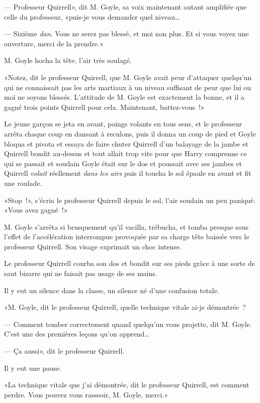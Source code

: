 --- Professeur Quirrell», dit M. Goyle, sa voix maintenant autant amplifiée que celle du professeur, «puis-je vous demander quel niveau…

--- Sixième \emph{dan}. Vous ne serez pas blessé, et moi non plus. Et si vous voyez une ouverture, merci de la prendre.»

M. Goyle hocha la tête, l'air très soulagé.

«Notez, dit le professeur Quirrell, que M. Goyle avait peur d'attaquer quelqu'un qui ne connaissait pas les arts martiaux à un niveau suffisant de peur que lui ou moi ne soyons blessés. L'attitude de M. Goyle est exactement la bonne, et il a gagné trois points Quirrell pour cela. Maintenant, battez-vous~!»

Le jeune garçon se jeta en avant, poings volants en tous sens, et le professeur arrêta chaque coup en dansant à reculons, puis il donna un coup de pied et Goyle bloqua et pivota et essaya de faire chuter Quirrell d'un balayage de la jambe et Quirrell bondit au-dessus et tout allait trop vite pour que Harry comprenne ce qui se passait et soudain Goyle était sur le dos et poussait avec ses jambes et Quirrell \emph{volait} réellement \emph{dans les airs} puis il toucha le sol épaule en avant et fit une roulade.

«Stop~!», s'écria le professeur Quirrell depuis le sol, l'air soudain un peu paniqué. «Vous avez gagné~!»

M. Goyle s'arrêta si brusquement qu'il vacilla, trébucha, et tomba presque sous l'effet de l'accélération interrompue provoquée par sa charge tête baissée vers le professeur Quirrell. Son visage exprimait un choc intense.

Le professeur Quirrell courba son dos et bondit sur ses pieds grâce à une sorte de saut bizarre qui ne faisait pas usage de ses mains.

Il y eut un silence dans la classe, un silence né d'une confusion totale.

«M. Goyle, dit le professeur Quirrell, quelle technique vitale ai-je démontrée~?

--- Comment tomber correctement quand quelqu'un vous projette, dit M. Goyle. C'est une des premières leçons qu'on apprend…

--- Ça aussi», dit le professeur Quirrell.

Il y eut une pause.

«La technique vitale que j'ai démontrée, dit le professeur Quirrell, est comment perdre. Vous pouvez vous rasseoir, M. Goyle, merci.»

